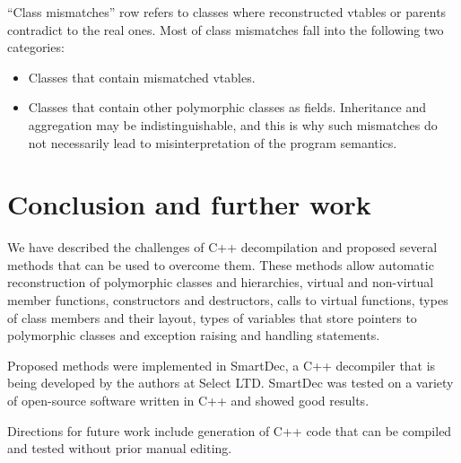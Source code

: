 \documentclass[10pt, conference, compsocconf]{IEEEtran}
\newcommand{\compact}{}
\newcommand{\skipspace}{}
\newcommand{\skipsectionspace}{}
\begin{document}
``Class mismatches'' row refers to classes where reconstructed vtables or parents
contradict to the real ones. Most of class mismatches fall into the
following two categories:
\skipspace\begin{itemize}\compact
\item Classes that contain mismatched vtables.
\item Classes that contain other polymorphic classes as fields.
    Inheritance and aggregation may be indistinguishable, 
	and this is why such mismatches do not necessarily 
	lead to misinterpretation of the program semantics.
\end{itemize}


\section{Conclusion and further work}\skipsectionspace

We have described the challenges of C++ decompilation and proposed
several methods that can be used to overcome them.
These methods allow automatic reconstruction
of polymorphic classes and hierarchies, 
virtual and non-virtual member functions, constructors and destructors,
calls to virtual functions,
types of class members and their layout,
types of variables that store pointers to polymorphic classes
and exception raising and handling statements.

Proposed methods were implemented in SmartDec, a C++ decompiler that is
being developed by the authors at Select LTD.
SmartDec was tested on a variety of open-source software written in C++
and showed good results.

Directions for future work include generation of C++ code that
can be compiled and tested without prior manual editing.



\end{document}
